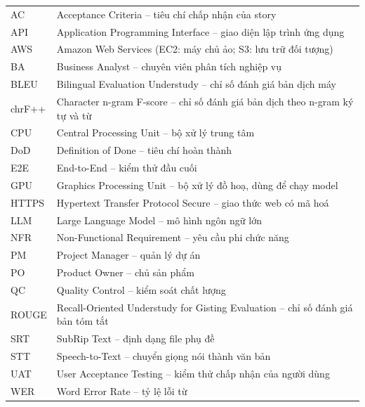\documentclass[12pt,a4paper]{report}
\begin{document}
\begin{center}
  \begin{tabular}{@{}P{2.2cm}P{13.2cm}@{}}
    \toprule
     &  \\
    \midrule
    AC     & Acceptance Criteria -- tiêu chí chấp nhận của story \\
    API    & Application Programming Interface -- giao diện lập trình ứng dụng \\
    AWS    & Amazon Web Services (EC2: máy chủ ảo; S3: lưu trữ đối tượng) \\
    BA     & Business Analyst -- chuyên viên phân tích nghiệp vụ \\
    BLEU   & Bilingual Evaluation Understudy -- chỉ số đánh giá bản dịch máy \\
    chrF++ & Character n-gram F-score -- chỉ số đánh giá bản dịch theo n-gram ký tự và từ \\
    CPU    & Central Processing Unit -- bộ xử lý trung tâm \\
    DoD    & Definition of Done -- tiêu chí hoàn thành \\
    E2E    & End-to-End -- kiểm thử đầu cuối \\
    GPU    & Graphics Processing Unit -- bộ xử lý đồ hoạ, dùng để chạy model \\
    HTTPS  & Hypertext Transfer Protocol Secure -- giao thức web có mã hoá \\
    LLM    & Large Language Model -- mô hình ngôn ngữ lớn \\
    NFR    & Non-Functional Requirement -- yêu cầu phi chức năng \\
    PM     & Project Manager -- quản lý dự án \\
    PO     & Product Owner -- chủ sản phẩm \\
    QC     & Quality Control -- kiểm soát chất lượng \\
    ROUGE  & Recall-Oriented Understudy for Gisting Evaluation -- chỉ số đánh giá bản tóm tắt \\
    SRT    & SubRip Text -- định dạng file phụ đề \\
    STT    & Speech-to-Text -- chuyển giọng nói thành văn bản \\
    UAT    & User Acceptance Testing -- kiểm thử chấp nhận của người dùng \\
    WER    & Word Error Rate -- tỷ lệ lỗi từ \\
    \bottomrule
  \end{tabular}
\end{center}
\end{document}

